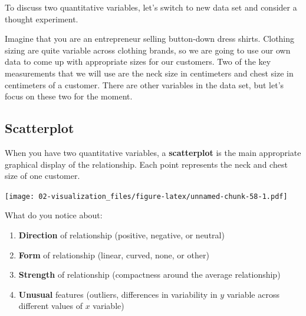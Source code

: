 \documentclass[
]{book}
\newenvironment{Shaded}{\begin{snugshade}}{\end{snugshade}}
\newcommand{\DataTypeTok}[1]{\textcolor[rgb]{0.13,0.29,0.53}{#1}}
\newcommand{\KeywordTok}[1]{\textcolor[rgb]{0.13,0.29,0.53}{\textbf{#1}}}
\newcommand{\NormalTok}[1]{#1}
\newcommand{\OperatorTok}[1]{\textcolor[rgb]{0.81,0.36,0.00}{\textbf{#1}}}
\newcommand{\StringTok}[1]{\textcolor[rgb]{0.31,0.60,0.02}{#1}}
\providecommand{\tightlist}{%
  \setlength{\itemsep}{0pt}\setlength{\parskip}{0pt}}
\begin{document}
To discuss two quantitative variables, let's switch to new data set and consider a thought experiment.

Imagine that you are an entrepreneur selling button-down dress shirts. Clothing sizing are quite variable across clothing brands, so we are going to use our own data to come up with appropriate sizes for our customers. Two of the key measurements that we will use are the neck size in centimeters and chest size in centimeters of a customer. There are other variables in the data set, but let's focus on these two for the moment.

\hypertarget{scatterplot}{%
\subsection{Scatterplot}\label{scatterplot}}

When you have two quantitative variables, a \textbf{scatterplot} is the main appropriate graphical display of the relationship. Each point represents the neck and chest size of one customer.

\begin{Shaded}
\end{Shaded}

\texttt{[image: 02-visualization\_files/figure-latex/unnamed-chunk-58-1.pdf]}

What do you notice about:

\begin{enumerate}
\def\labelenumi{\arabic{enumi}.}
\tightlist
\item
  \textbf{Direction} of relationship (positive, negative, or neutral)
\item
  \textbf{Form} of relationship (linear, curved, none, or other)
\item
  \textbf{Strength} of relationship (compactness around the average relationship)
\item
  \textbf{Unusual} features (outliers, differences in variability in \(y\) variable across different values of \(x\) variable)
\end{enumerate}
\end{document}

